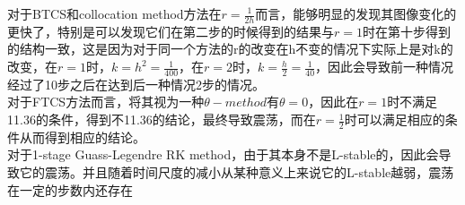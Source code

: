 \documentclass{article}
\begin{document}
\indent 对于BTCS和collocation method方法在$r=\frac{1}{2h}$而言，能够明显的发现其图像变化的更快了，特别是可以发现它们在第二步的时候得到的结果与$r=1$时在第十步得到的结构一致，这是因为对于同一个方法的r的改变在h不变的情况下实际上是对k的改变，在$r=1$时，$k=h^2=\frac{1}{400}$，在$r=2$时，$k=\frac{h}{2}=\frac{1}{40}$，因此会导致前一种情况经过了10步之后在达到后一种情况2步的情况。\\
\indent 对于FTCS方法而言，将其视为一种$\theta-method$有$\theta=0$，因此在$r=1$时不满足11.36的条件，得到不11.36的结论，最终导致震荡，而在$r=\frac{1}{2}$时可以满足相应的条件从而得到相应的结论。\\
\indent 对于1-stage Guass-Legendre RK method，由于其本身不是L-stable的，因此会导致它的震荡。并且随着时间尺度的减小从某种意义上来说它的L-stable越弱，震荡在一定的步数内还存在
\end{document}

